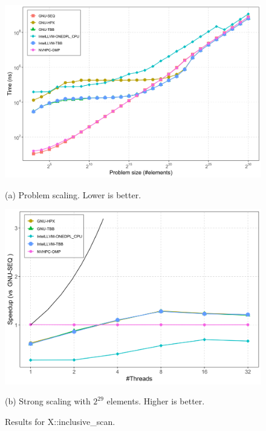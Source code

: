 \documentclass[sigconf]{acmart}
\begin{document}
\begin{figure}[H]
      \centering
      \begin{minipage}[t]{0.48\linewidth}
            \centering
            \includegraphics[width=\linewidth]{figures/problemSize_time-inclusive_scan.png}
            \caption*{(a) Problem scaling. Lower is better.}
      \end{minipage}
      \hfill
      \begin{minipage}[t]{0.48\linewidth}
            \centering
            \includegraphics[width=\linewidth]{figures/speedup_threads-inclusive_scan.png}
            \caption*{(b) Strong scaling with $2^{29}$ elements. Higher is better.}
      \end{minipage}
      \caption{Results for X::inclusive\_scan.}\label{fig:x::inclusive_scan}
\end{figure}
\end{document}
